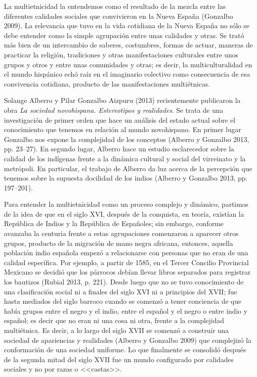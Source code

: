 La multietnicidad la entendemos como el resultado de la mezcla entre las
diferentes calidades sociales que convivieron en la Nueva España (Gonzalbo
2009). La relevancia que tuvo en la vida cotidiana de la Nueva España no sólo
se debe entender como la simple agrupación entre unas calidades y otras. Se
trató más bien de un intercambio de saberes, costumbres, formas de actuar,
maneras de practicar la religión, tradiciones y otras manifestaciones
culturales entre unos grupos y otros y entre unas comunidades y otras; es
decir, la multiculturalidad en el mundo hispánico echó raíz en el imaginario
colectivo como consecuencia de esa convivencia cotidiana, producto de las
manifestaciones multiétnicas.


Solange Alberro y Pilar Gonzalbo Aizpuru (2013) recientemente publicaron la obra
\textit{La sociedad novohispana. Estereotipos y realidades}. Se trata de una
investigación de primer orden que hace un análisis del estado actual sobre el
conocimiento que tenemos en relación al mundo novohispano. En primer lugar
Gonzalbo nos expone la complejidad de los conceptos (Alberro y Gonzalbo 2013,
pp. 23--27). En segundo lugar, Alberro hace un estudio esclarecedor sobre la calidad
de los indígenas frente a la dinámica cultural y social del virreinato y la
metrópoli. En particular, el trabajo de Alberro da luz acerca de la percepción
que tenemos sobre la supuesta docilidad de los indios (Alberro y Gonzalbo
2013, pp. 197--201).


Para entender la multietnicidad como un proceso complejo y dinámico, partimos de
la idea de que en el siglo XVI, después de la conquista, en teoría, existían la
República de Indios y la República de Españoles; sin embargo, conforme avanzaba
la centuria frente a estas agrupaciones comenzaron a aparecer otros grupos,
producto de la migración de mano negra africana, entonces, aquella población
indio española empezó a relacionarse con personas que no eran de una calidad
específica. Por ejemplo, a partir de 1585, en el Tercer Concilio Provincial
Mexicano se decidió que los párrocos debían llevar libros separados para
registrar los bautizos (Rubial 2013, p. 221). Desde luego que no se tuvo
conocimiento de una clasificación social ni a finales del siglo XVI ni a
principios del XVII; fue hasta mediados del siglo barroco cuando se comenzó a
tener conciencia de que había grupos entre el negro y el indio, entre el
español y el negro o entre indio y español; es decir que no eran ni una cosa ni
otra, frente a la complejidad multiétnica. Es decir, a lo largo del siglo XVII
se comenzó a construir una sociedad de apariencias y realidades (Alberro y
Gonzalbo 2009) que complejizó la conformación de una sociedad uniforme. Lo que
finalmente se consolidó después de la segunda mitad del siglo XVII fue un mundo
configurado por calidades sociales y no por razas o <<castas>>.


